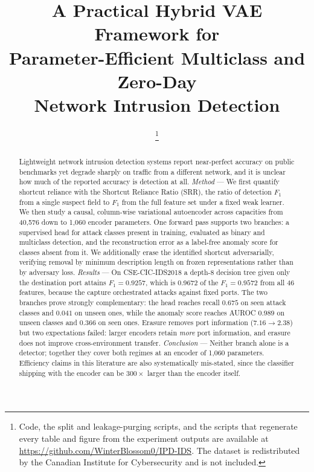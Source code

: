 \documentclass[conference]{IEEEtran}
\newcommand{\SRRport}{0.9257}
\newcommand{\SRRall}{0.9572}
\newcommand{\SRRratio}{0.9672}
\newcommand{\paramsXS}{1{,}060}
\newcommand{\paramsL}{40{,}576}
\begin{document}
\title{A Practical Hybrid VAE Framework for\\
Parameter-Efficient Multiclass and Zero-Day\\
Network Intrusion Detection}

\author{%
%
\thanks{Code, the split and leakage-purging scripts, and the scripts that regenerate every
table and figure from the experiment outputs are available at
\url{https://github.com/WinterBlossom0/IPD-IDS}. The dataset is redistributed by the
Canadian Institute for Cybersecurity and is not included.}%
}

\maketitle

\begin{abstract}
Lightweight network intrusion detection systems report near-perfect
accuracy on public benchmarks yet degrade sharply on traffic from a different network, and
it is unclear how much of the reported accuracy is detection at all.
\textit{Method} --- We first quantify shortcut reliance with the Shortcut Reliance Ratio
(SRR), the ratio of detection $F_1$ from a single suspect field to $F_1$ from the full
feature set under a fixed weak learner. We then study a causal, column-wise variational
autoencoder across capacities from \paramsL{} down to \paramsXS{} encoder parameters. One
forward pass supports two branches: a supervised head for attack classes present in
training, evaluated as binary and multiclass detection, and the reconstruction error as a
label-free anomaly score for classes absent from it. We additionally erase the identified
shortcut adversarially, verifying removal by minimum description length on frozen
representations rather than by adversary loss.
\textit{Results} --- On CSE-CIC-IDS2018 a depth-8 decision tree given only the destination
port attains $F_1 = \SRRport$, which is \SRRratio{} of the $F_1 = \SRRall$ from all 46
features, because the capture orchestrated attacks against fixed ports. The two branches
prove strongly complementary: the head reaches recall $0.675$ on seen attack classes and
$0.041$ on unseen ones, while the anomaly score reaches AUROC $0.989$ on unseen classes and
$0.366$ on seen ones. Erasure removes port information ($7.16 \rightarrow 2.38$) but two
expectations failed: larger encoders retain \emph{more} port information, and erasure does
not improve cross-environment transfer.
\textit{Conclusion} --- Neither branch alone is a detector; together they cover both regimes
at an encoder of \paramsXS{} parameters. Efficiency claims in this literature are also
systematically mis-stated, since the classifier shipping with the encoder can be $300\times$
larger than the encoder itself.
\end{abstract}
\end{document}
